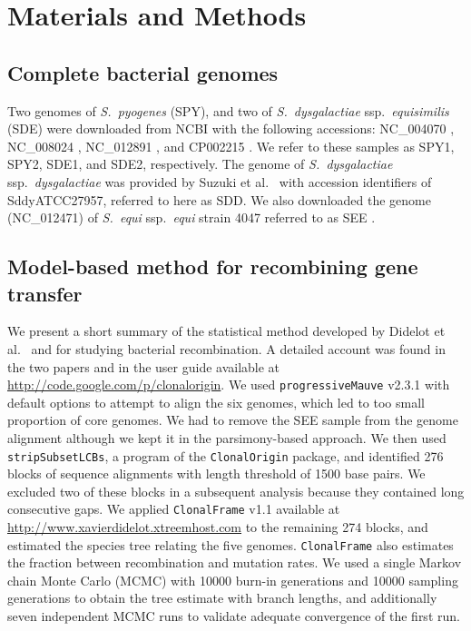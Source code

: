 \documentclass[10pt]{article}
\let\citep\cite
\let\citet\cite
\begin{document}
\section*{Materials and Methods}

\subsection*{Complete bacterial genomes}

Two genomes of \textit{S.\ pyogenes} (SPY), and two of \textit{S.\ dysgalactiae}
ssp.\textit{\ equisimilis} (SDE) were downloaded from NCBI with the following
accessions: NC\_004070 \citep{Beres2002}, NC\_008024 \citep{Beres2006},
NC\_012891 \citep{Shimomura2011}, and CP002215 \citep{Suzuki2011}. We refer to
these samples as SPY1, SPY2, SDE1, and SDE2, respectively. The genome of
\textit{S.\ dysgalactiae} ssp.\textit{\ dysgalactiae} was provided by
Suzuki et al.\ \citet{Suzuki2011} with accession identifiers of SddyATCC27957, referred to here
as SDD. We also downloaded the genome (NC\_012471) of \textit{S.\ equi}
ssp.\textit{\ equi} strain 4047 referred to as SEE \citep{Holden2009}.

\subsection*{Model-based method for recombining gene transfer}

We present a short summary of the statistical method developed by
Didelot et al.\ \citet{Didelot2007} and \citet{Didelot2010} for studying bacterial
recombination. A detailed account was found in the two papers and in the user
guide available at \url{http://code.google.com/p/clonalorigin}.  We used
\texttt{progressiveMauve} v2.3.1 \citep{Darling2004,Darling2010} with default
options to attempt to align the six genomes, which led to too small proportion
of core genomes. We had to remove the SEE sample from the genome alignment
although we kept it in the parsimony-based approach.  We then used
\texttt{stripSubsetLCBs}, a program of the \texttt{ClonalOrigin} package, and
identified 276 blocks of sequence alignments with length threshold of 1500 base
pairs.  We excluded two of these blocks in a subsequent analysis because they
contained long consecutive gaps.  We applied \texttt{ClonalFrame} v1.1 available
at \url{http://www.xavierdidelot.xtreemhost.com} to the remaining 274 blocks,
and estimated the species tree relating the five genomes. \texttt{ClonalFrame}
also estimates the fraction between recombination and mutation rates.
We used a single Markov chain Monte Carlo (MCMC) with 10000 burn-in generations
and 10000 sampling generations to obtain the tree estimate with branch lengths,
and additionally seven independent MCMC runs to validate adequate convergence of
the first run.
\end{document}
